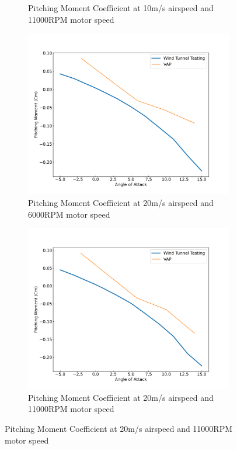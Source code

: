 \begin{figure}[H]
\begin{subfigure}[b]{0.467\textwidth}
        \caption{Pitching Moment Coefficient at 10m/s airspeed and 11000RPM motor speed}
        \label{fig:VAP_pusher_Cm_10ms_11000}
    \end{subfigure}
    \begin{subfigure}[b]{0.467\textwidth}
        \centering
        \includegraphics[width=\textwidth]{05_Results/VAP/pusher/Cm/20ms_6000RPM_Cm.png}
        \caption{Pitching Moment Coefficient at 20m/s airspeed and 6000RPM motor speed}
        \label{fig:VAP_pusher_Cm_20ms_6000}
    \end{subfigure}
    \begin{subfigure}[b]{0.467\textwidth}
        \centering
        \includegraphics[width=\textwidth]{05_Results/VAP/pusher/Cm/20ms_11000RPM_Cm.png}
        \caption{Pitching Moment Coefficient at 20m/s airspeed and 11000RPM motor speed}
        \label{fig:VAP_pusher_Cm_20ms_11000}
    \end{subfigure}
\end{figure}


